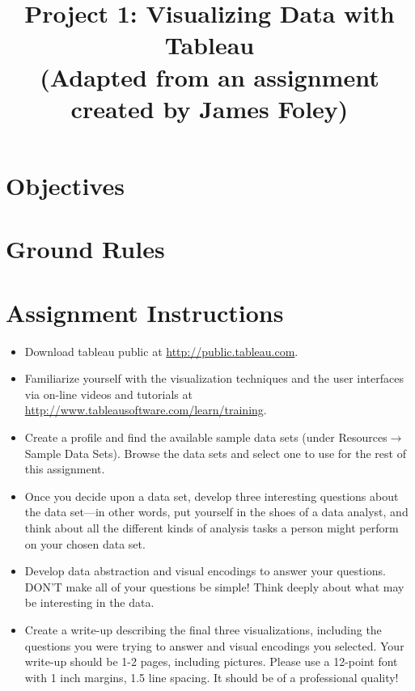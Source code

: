 \documentclass[a4paper,12pt]{article}
\title{Project 1: Visualizing Data with Tableau \\
\vspace{5pt}\normalsize (Adapted from an assignment created by James Foley)}
\begin{document}
\maketitle


\section{Objectives}


\vspace{5pt}
\section{Ground Rules}



\vspace{5pt}
\section{Assignment Instructions}

\begin{itemize}

\item Download tableau public at  \url{http://public.tableau.com}.

\item Familiarize yourself with the visualization techniques and the user interfaces via on-line videos  and tutorials at \url{http://www.tableausoftware.com/learn/training}.

\item Create a profile and find the available sample data sets (under Resources$\rightarrow$Sample Data Sets). Browse the data sets and select one to use for the rest of this assignment. 
\item Once you decide upon a data set, develop three interesting questions about the data set---in other words, put yourself in the shoes of a data analyst, and think about all the different kinds of analysis tasks a person might perform on your chosen data set. 
\item Develop data abstraction and visual encodings to answer your questions. DON'T make all of your questions be simple! Think deeply about what may be interesting in the data.
\item Create a write-up describing the final three visualizations, including the questions you were trying to answer and visual encodings you selected. Your write-up should be 1-2 pages, including pictures. Please use a 12-point font with 1 inch margins, 1.5 line spacing. It should be of a professional quality! 

\end{itemize}
\end{document}
